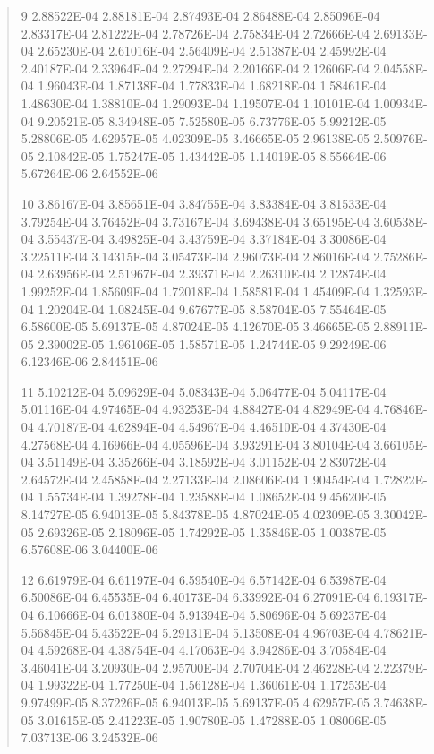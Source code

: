 \documentclass[letterpaper,10pt,english]{sphinxmanual}
\begin{document}
\begin{quote}
\begin{DUlineblock}{0em}
\begin{DUlineblock}{\DUlineblockindent}
\item[] 9   2.88522E-04  2.88181E-04  2.87493E-04  2.86488E-04  2.85096E-04  2.83317E-04  2.81222E-04  2.78726E-04  2.75834E-04  2.72666E-04  2.69133E-04  2.65230E-04  2.61016E-04  2.56409E-04  2.51387E-04  2.45992E-04  2.40187E-04  2.33964E-04  2.27294E-04  2.20166E-04  2.12606E-04  2.04558E-04  1.96043E-04  1.87138E-04  1.77833E-04  1.68218E-04  1.58461E-04  1.48630E-04  1.38810E-04  1.29093E-04  1.19507E-04  1.10101E-04  1.00934E-04  9.20521E-05  8.34948E-05  7.52580E-05  6.73776E-05  5.99212E-05  5.28806E-05  4.62957E-05  4.02309E-05  3.46665E-05  2.96138E-05  2.50976E-05  2.10842E-05  1.75247E-05  1.43442E-05  1.14019E-05  8.55664E-06  5.67264E-06  2.64552E-06
\end{DUlineblock}
\item[] 10   3.86167E-04  3.85651E-04  3.84755E-04  3.83384E-04  3.81533E-04  3.79254E-04  3.76452E-04  3.73167E-04  3.69438E-04  3.65195E-04  3.60538E-04  3.55437E-04  3.49825E-04  3.43759E-04  3.37184E-04  3.30086E-04  3.22511E-04  3.14315E-04  3.05473E-04  2.96073E-04  2.86016E-04  2.75286E-04  2.63956E-04  2.51967E-04  2.39371E-04  2.26310E-04  2.12874E-04  1.99252E-04  1.85609E-04  1.72018E-04  1.58581E-04  1.45409E-04  1.32593E-04  1.20204E-04  1.08245E-04  9.67677E-05  8.58704E-05  7.55464E-05  6.58600E-05  5.69137E-05  4.87024E-05  4.12670E-05  3.46665E-05  2.88911E-05  2.39002E-05  1.96106E-05  1.58571E-05  1.24744E-05  9.29249E-06  6.12346E-06  2.84451E-06
\item[] 11   5.10212E-04  5.09629E-04  5.08343E-04  5.06477E-04  5.04117E-04  5.01116E-04  4.97465E-04  4.93253E-04  4.88427E-04  4.82949E-04  4.76846E-04  4.70187E-04  4.62894E-04  4.54967E-04  4.46510E-04  4.37430E-04  4.27568E-04  4.16966E-04  4.05596E-04  3.93291E-04  3.80104E-04  3.66105E-04  3.51149E-04  3.35266E-04  3.18592E-04  3.01152E-04  2.83072E-04  2.64572E-04  2.45858E-04  2.27133E-04  2.08606E-04  1.90454E-04  1.72822E-04  1.55734E-04  1.39278E-04  1.23588E-04  1.08652E-04  9.45620E-05  8.14727E-05  6.94013E-05  5.84378E-05  4.87024E-05  4.02309E-05  3.30042E-05  2.69326E-05  2.18096E-05  1.74292E-05  1.35846E-05  1.00387E-05  6.57608E-06  3.04400E-06
\item[] 12   6.61979E-04  6.61197E-04  6.59540E-04  6.57142E-04  6.53987E-04  6.50086E-04  6.45535E-04  6.40173E-04  6.33992E-04  6.27091E-04  6.19317E-04  6.10666E-04  6.01380E-04  5.91394E-04  5.80696E-04  5.69237E-04  5.56845E-04  5.43522E-04  5.29131E-04  5.13508E-04  4.96703E-04  4.78621E-04  4.59268E-04  4.38754E-04  4.17063E-04  3.94286E-04  3.70584E-04  3.46041E-04  3.20930E-04  2.95700E-04  2.70704E-04  2.46228E-04  2.22379E-04  1.99322E-04  1.77250E-04  1.56128E-04  1.36061E-04  1.17253E-04  9.97499E-05  8.37226E-05  6.94013E-05  5.69137E-05  4.62957E-05  3.74638E-05  3.01615E-05  2.41223E-05  1.90780E-05  1.47288E-05  1.08006E-05  7.03713E-06  3.24532E-06

\end{DUlineblock}
\end{quote}
\end{document}
